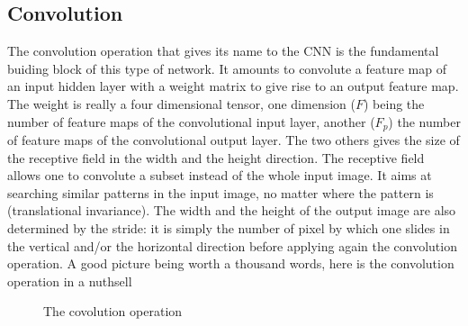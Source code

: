 \subsection{Convolution}

The convolution operation that gives its name to the CNN is the fundamental buiding block of this type of network. It amounts to convolute a feature map of an input hidden layer with a weight matrix to give rise to an output feature map. The weight is really a four dimensional tensor, one dimension ($F$) being the number of feature maps of the convolutional input layer, another ($F_p$) the number of feature maps of the convolutional output layer. The two others gives the size of the receptive field in the width and the height direction. The receptive field allows one to convolute a subset instead of the whole input image. It aims at searching similar patterns in the input image, no matter where the pattern is (translational invariance). The width and the height of the output image are also determined by the stride: it is simply the number of pixel by which one slides in the vertical and/or the horizontal direction before applying again the convolution operation. A good picture being worth a thousand words, here is the convolution operation in a nuthsell

\begin{figure}[H]
\begin{center}
\caption{The covolution operation}
\end{center}
\end{figure}

